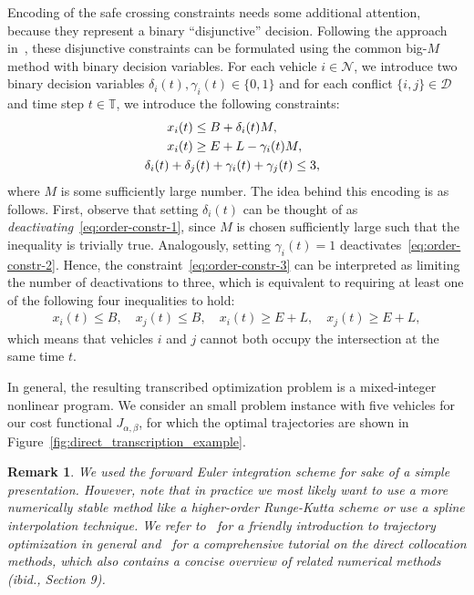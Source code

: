 \documentclass[a4paper]{report}
\theoremstyle{definition}
\theoremstyle{plain}
\newtheorem*{remark}{Remark}
\begin{document}
Encoding of the safe crossing constraints needs some additional attention,
because they represent a binary ``disjunctive'' decision.
%
Following the approach in~\cite{hultApproximateSolutionOptimal2015}, these disjunctive constraints can be formulated
using the common big-$M$ method with binary decision variables. For each vehicle
$i \in \mathcal{N}$, we introduce two binary decision variables
$\delta_{i}(t), \gamma_{i}(t) \in \{ 0, 1 \}$ and for each conflict $\{i, j\} \in \mathcal{D}$ and
time step $t \in \mathbb{T}$, we introduce the following constraints:
\begin{subequations}\label{eq:collision-avoidance-binary-encoding}
  \begin{align}
  x_{i}(t) &\leq B + \delta_{i}(t) M , \label{eq:order-constr-1} \\
  \quad x_{i}(t) &\geq E + L - \gamma_{i}(t) M , \label{eq:order-constr-2} \\
  & \hspace{-3.8em} \delta_{i}(t) + \delta_{j}(t) + \gamma_{i}(t) + \gamma_{j}(t) \leq 3 , \label{eq:order-constr-3}
  \end{align}
\end{subequations}
where $M$ is some sufficiently large number.
%
The idea behind this encoding is as follows.
%
First, observe that setting $\delta_{i}(t) $ can be thought of as
\emph{deactivating}~\eqref{eq:order-constr-1}, since $M$ is chosen sufficiently
large such that the inequality is trivially true. Analogously, setting
$\gamma_{i}(t) = 1$ deactivates~\eqref{eq:order-constr-2}.
%
Hence, the constraint~\eqref{eq:order-constr-3} can be interpreted as limiting
the number of deactivations to three, which is equivalent to requiring at least
one of the following four inequalities to hold:
\begin{align*}
  x_{i}(t) \leq B, \quad x_{j}(t) \leq B , \quad
  x_{i}(t) \geq E + L, \quad x_{j}(t) \geq E + L ,
\end{align*}
which means that vehicles $i$ and $j$ cannot both occupy the intersection at the
same time $t$.

In general, the resulting transcribed optimization problem is a mixed-integer
nonlinear program. We consider an small problem instance with five vehicles for
our cost functional $J_{\alpha,\beta}$, for which the optimal trajectories are
shown in Figure~\ref{fig:direct_transcription_example}.

\begin{remark}
  We used the forward Euler integration scheme for sake of a simple
  presentation. However, note that in practice we most likely want to use a more
  numerically stable method like a higher-order Runge-Kutta scheme or use a
  spline interpolation technique. We refer to~\cite{TrajectoryOptimization} for a friendly introduction to
  trajectory optimization in general and~\cite{kellyIntroductionTrajectoryOptimization2017} for a comprehensive tutorial on
  the direct collocation methods, which also contains a concise overview of
  related numerical methods (ibid., Section 9).
\end{remark}
\end{document}
